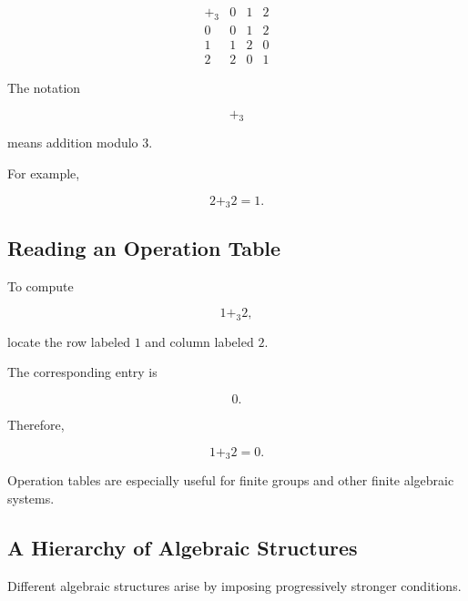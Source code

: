 \[
\begin{array}{c|ccc}
+_3 & 0 & 1 & 2\\
\hline
0 & 0 & 1 & 2\\
1 & 1 & 2 & 0\\
2 & 2 & 0 & 1
\end{array}
\]

The notation

\[ +_3 \]

means addition modulo \(3\).

For example,

\[ 2+_3 2=1. \]

\subsection{Reading an Operation Table}
\label{subsec:reading-operation-table}

To compute

\[ 1+_3 2, \]

locate the row labeled \(1\) and column labeled \(2\).

The corresponding entry is

\[ 0. \]

Therefore,

\[ 1+_3 2=0. \]

Operation tables are especially useful for finite groups and other finite
algebraic systems.

\subsection{A Hierarchy of Algebraic Structures}
\label{subsec:hierarchy-algebraic-structures}

Different algebraic structures arise by imposing progressively stronger
conditions.

\begin{center}
\end{center}

